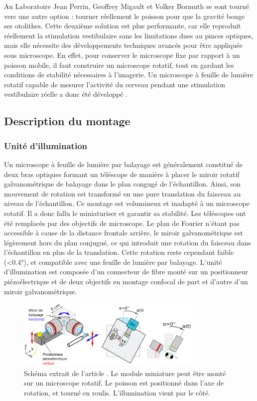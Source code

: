 Au Laboratoire Jean Perrin, Geoffrey Migault et Volker Bormuth se sont tourné vers une autre option : tourner réellement le poisson pour que la gravité bouge ses otolithes.
Cette deuxième solution est plus performante, car elle reproduit réellement la stimulation vestibulaire sans les limitations dues au pinces optiques, mais elle nécessite des développements techniques avancés pour être appliquée sous microscope. En effet, pour conserver le microscope fixe par rapport à un poisson mobile, il faut construire un microscope rotatif, tout en gardant les conditions de stabilité nécessaires à l'imagerie. Un microscope à feuille de lumière rotatif capable de mesurer l'activité du cerveau pendant une stimulation vestibulaire réelle a donc été développé \cite{migault_whole-brain_2018}.

\subsection{Description du montage}

\subsubsection{Unité d'illumination}

Un microscope à feuille de lumière par balayage est généralement constitué de deux bras optiques formant un téléscope de manière à placer le miroir rotatif galvanométrique de balayage dans le plan congugé de l'échantillon. Ainsi, son mouvement de rotation est transformé en une pure translation du faisceau au niveau de l'échantillon. Ce montage est volumineux et inadapté à un microscope rotatif. Il a donc fallu le miniaturiser et garantir sa stabilité. Les téléscopes ont été remplacés par des objectifs de microscope. Le plan de Fourier n'étant pas accessible à cause de la distance frontale arrière, le miroir galvanométrique est légèrement hors du plan conjugué, ce qui introduit une rotation du faisceau dans l'échantillon en plus de la translation. Cette rotation reste cependant faible (<0.4°), et compatible avec une feuille de lumière par balayage.  
L'unité d'illumination est composée d'un connecteur de fibre monté sur un positionneur piézoélectrique et de deux objectifs en montage confocal de part et d'autre d'un miroir galvanométrique. 

\begin{figure}
\centering
\includegraphics[width=0.8\textwidth]{./files/miniature_light-sheet.svg.png}
\caption{Schéma extrait de l'article \cite{migault_whole-brain_2018}. Le module miniature peut être monté sur un microscope rotatif. Le poisson est positionné dans l'axe de rotation, et tourné en roulis. L'illumination vient par le côté.
}
\end{figure}

